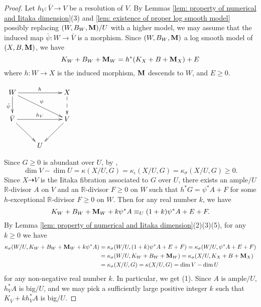 \documentclass[11pt]{amsart}
\numberwithin{equation}{section}
\newcommand{\Mm}{{\bf{M}}}
\newcommand{\Rr}{\mathbb{R}}
\theoremstyle{definition}
\theoremstyle{definition}
\theoremstyle{definition}
\begin{document}
\begin{proof}
Let $h_V: \bar V\rightarrow V$ be a resolution of $V$. By Lemmas \ref{lem: property of numerical and Iitaka dimension}(3) and \ref{lem: existence of proper log smooth model} possibly replacing $(W,B_W,\Mm)/U$ with a higher model, we may assume that the induced map $\bar\psi: W\rightarrow\bar V$ is a morphism. Since $(W,B_W,\Mm)$ a log smooth model of $(X,B,\Mm)$, we have
$$K_W+B_W+\Mm_W=h^*(K_X+B+\Mm_X)+E$$ where $h: W\to X$ is the induced morphism, $\Mm$ descends to $W$, and $E\geq 0$.
\begin{center}$\xymatrix{
W\ar@{->}[d]_{\bar\psi}\ar@{->}[drr]^{\psi}\ar@{->}[rr]^{h} &  & X\ar@{-->}[d] \\
\bar V\ar@{->}[dr]\ar@{->}[rr]^{h_V}&    & V\ar@{->}[dl] \\
 & U &
}$
\end{center}
Since $G\geq 0$ is abundant over $U$, by \cite[Proposition 2.2.2(1)]{Cho08}, $$\dim V-\dim U=\kappa(X/U,G)=\kappa_{\iota}(X/U,G)=\kappa_{\sigma}(X/U,G)\geq 0.$$
Since $X\dashrightarrow V$ is the Iitaka fibration associated to $G$ over $U$, there exists an ample$/U$ $\Rr$-divisor $A$ on $V$ and an $\Rr$-divisor $F\geq 0$ on $W$ such that $h^*G=\psi^*A+F$ 
for some $h$-exceptional $\Rr$-divisor $F\geq 0$ on $W$. Then for any real number $k$, we have
$$K_W+B_W+\Mm_W+k\psi^*A\equiv_{U}(1+k)\psi^*A+E+F.$$
By Lemma \ref{lem: property of numerical and Iitaka dimension}(2)(3)(5), for any $k\geq 0$ we have \begin{align*}
    \kappa_{\sigma}(W/U,K_W+B_W+\Mm_W+k\psi^*A)&=\kappa_{\sigma}(W/U,(1+k)\psi^*A+E+F)=\kappa_{\sigma}(W/U,\psi^*A+E+F)\\
    &=\kappa_{\sigma}(W/U,K_W+B_W+\Mm_W)=\kappa_{\sigma}(X/U,K_X+B+\Mm_X)\\
    &=\kappa_{\sigma}(X/U,G)=\kappa(X/U,G)=\dim V-\dim U
\end{align*}
for any non-negative real number $k$. In particular, we get (1). Since $A$ is ample$/U$, $h_V^*A$ is big$/U$, and we may pick a sufficiently large positive integer $k$ such that $K_{\bar V}+kh_V^*A$ is big$/U$. 



\end{proof}
\end{document}
